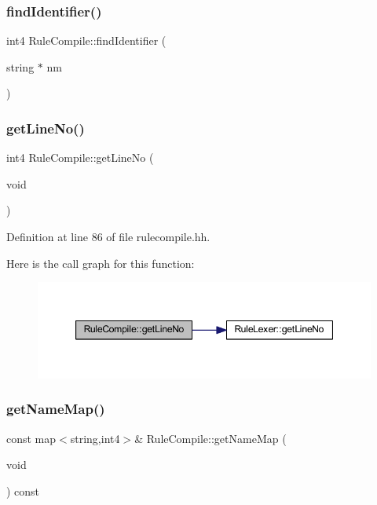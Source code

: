 \subsubsection{\texorpdfstring{findIdentifier()}{findIdentifier()}}
{\footnotesize\ttfamily int4 Rule\+Compile\+::find\+Identifier (\begin{DoxyParamCaption}\item[{string $\ast$}]{nm }\end{DoxyParamCaption})}

\mbox{\label{class_rule_compile_ae6102d7e485017165cdd2333000421d4}} 
\subsubsection{\texorpdfstring{getLineNo()}{getLineNo()}}
{\footnotesize\ttfamily int4 Rule\+Compile\+::get\+Line\+No (\begin{DoxyParamCaption}\item[{void}]{ }\end{DoxyParamCaption})\hspace{0.3cm}{\ttfamily [inline]}}



Definition at line 86 of file rulecompile.\+hh.

Here is the call graph for this function\+:
\nopagebreak
\begin{figure}[H]
\begin{center}
\leavevmode
\includegraphics[width=347pt]{class_rule_compile_ae6102d7e485017165cdd2333000421d4_cgraph}
\end{center}
\end{figure}
\mbox{\label{class_rule_compile_a0d39f7eaaaa68df15841953c7d41b2e9}} 
\subsubsection{\texorpdfstring{getNameMap()}{getNameMap()}}
{\footnotesize\ttfamily const map$<$string,int4$>$\& Rule\+Compile\+::get\+Name\+Map (\begin{DoxyParamCaption}\item[{void}]{ }\end{DoxyParamCaption}) const\hspace{0.3cm}{\ttfamily [inline]}}




